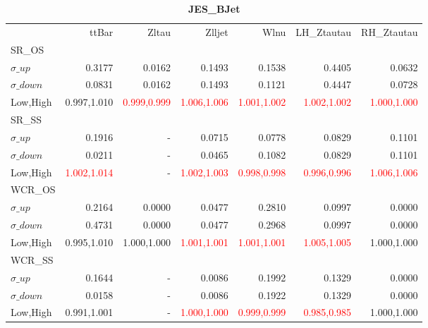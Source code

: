 \documentclass[11pt,oneside,a4paper]{article}
\begin{document}
\begin{table}
\caption{\bf{JES\_BJet}}
\centering
\begin{tabular}{lrrrrrr}
& ttBar & Zltau & Zlljet & Wlnu & LH\_Ztautau & RH\_Ztautau \\

SR\_OS &  &  &  &  &  &  \\
$\sigma\_up$ & 0.3177 & 0.0162 & 0.1493 & 0.1538 & 0.4405 & 0.0632 \\
$\sigma\_down$ & 0.0831 & 0.0162 & 0.1493 & 0.1121 & 0.4447 & 0.0728 \\
Low,High & 0.997,1.010 & \textcolor{red}{0.999,0.999} & \textcolor{red}{1.006,1.006} & \textcolor{red}{1.001,1.002} & \textcolor{red}{1.002,1.002} & \textcolor{red}{1.000,1.000} \\

\hline
SR\_SS &  &  &  &  &  &  \\
$\sigma\_up$ & 0.1916 & - & 0.0715 & 0.0778 & 0.0829 & 0.1101 \\
$\sigma\_down$ & 0.0211 & - & 0.0465 & 0.1082 & 0.0829 & 0.1101 \\
Low,High & \textcolor{red}{1.002,1.014} & - & \textcolor{red}{1.002,1.003} & \textcolor{red}{0.998,0.998} & \textcolor{red}{0.996,0.996} & \textcolor{red}{1.006,1.006} \\

\hline
WCR\_OS &  &  &  &  &  &  \\
$\sigma\_up$ & 0.2164 & 0.0000 & 0.0477 & 0.2810 & 0.0997 & 0.0000 \\
$\sigma\_down$ & 0.4731 & 0.0000 & 0.0477 & 0.2968 & 0.0997 & 0.0000 \\
Low,High & 0.995,1.010 & 1.000,1.000 & \textcolor{red}{1.001,1.001} & \textcolor{red}{1.001,1.001} & \textcolor{red}{1.005,1.005} & 1.000,1.000 \\

\hline
WCR\_SS &  &  &  &  &  &  \\
$\sigma\_up$ & 0.1644 & - & 0.0086 & 0.1992 & 0.1329 & 0.0000 \\
$\sigma\_down$ & 0.0158 & - & 0.0086 & 0.1922 & 0.1329 & 0.0000 \\
Low,High & 0.991,1.001 & - & \textcolor{red}{1.000,1.000} & \textcolor{red}{0.999,0.999} & \textcolor{red}{0.985,0.985} & 1.000,1.000 \\

\end{tabular}
\end{table}
\end{document}
